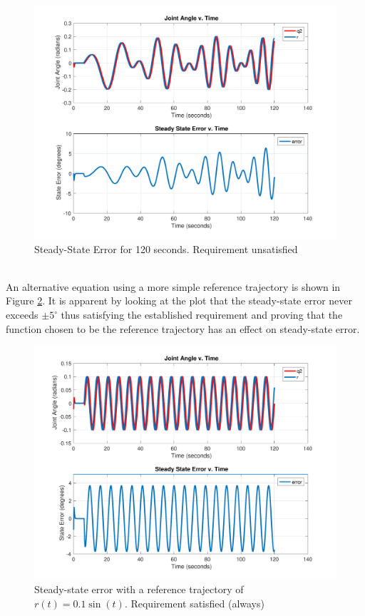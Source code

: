 \documentclass[12pt]{article}
\begin{document}
\\
\begin{figure}[h!]
\centering
\includegraphics[width=1\textwidth]{StateError120.pdf}
\caption{Steady-State Error for 120 seconds. Requirement unsatisfied}
\label{valid2}
\end{figure}
\\
An alternative equation using a more simple reference trajectory is shown in Figure \ref{valid3}. It is apparent by looking at the plot that the steady-state error never exceeds $\pm5^{\circ}$ thus satisfying the established requirement and proving that the function chosen to be the reference trajectory has an effect on steady-state error.
\begin{figure}[h!]
\centering
\includegraphics[width=1\textwidth]{StateErrorAltEqn.pdf}
\caption{Steady-state error with a reference trajectory of $r(t)=0.1\sin(t)$. Requirement satisfied (always)}
\label{valid3}
\end{figure}
\\
\clearpage
\end{document}
